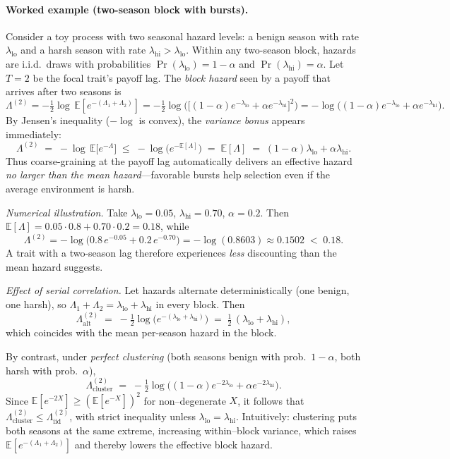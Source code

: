 \documentclass[11pt]{article}
\theoremstyle{upright}
\newcommand{\E}{\mathbb{E}}
\begin{document}
\paragraph{Worked example (two-season block with bursts).}
Consider a toy process with two seasonal hazard levels:
a benign season with rate $\lambda_{\mathrm{lo}}$ and a harsh season with rate $\lambda_{\mathrm{hi}}>\lambda_{\mathrm{lo}}$.
Within any two-season block, hazards are i.i.d.\ draws with probabilities
$\Pr(\lambda_{\mathrm{lo}})=1-\alpha$ and $\Pr(\lambda_{\mathrm{hi}})=\alpha$.
Let $T=2$ be the focal trait’s payoff lag. The \emph{block hazard} seen by a payoff that arrives after two seasons is
\[
\Lambda^{(2)}
= -\tfrac{1}{2}\log \,\E\!\left[e^{-(\Lambda_1+\Lambda_2)}\right]
= -\tfrac{1}{2}\log\!\Big( \big[(1-\alpha)e^{-\lambda_{\mathrm{lo}}}+\alpha e^{-\lambda_{\mathrm{hi}}}\big]^2 \Big)
= -\log\!\big((1-\alpha)e^{-\lambda_{\mathrm{lo}}}+\alpha e^{-\lambda_{\mathrm{hi}}}\big).
\]
By Jensen’s inequality ($-\log$ is convex), the \emph{variance bonus} appears immediately:
\[
\Lambda^{(2)} \;=\; -\log\,\E\!\big[e^{-\Lambda}\big]
\;\le\; -\log\!\big(e^{-\E[\Lambda]}\big) \;=\; \E[\Lambda]
\;=\; (1-\alpha)\lambda_{\mathrm{lo}}+\alpha\lambda_{\mathrm{hi}}.
\]
Thus coarse-graining at the payoff lag automatically delivers an effective hazard \emph{no larger than the mean hazard}—favorable bursts help selection even if the average environment is harsh.

\medskip
\noindent\textit{Numerical illustration.}
Take $\lambda_{\mathrm{lo}}=0.05$, $\lambda_{\mathrm{hi}}=0.70$, $\alpha=0.2$.
Then $\E[\Lambda]=0.05\cdot 0.8+0.70\cdot 0.2=0.18$,
while
\[
\Lambda^{(2)} = -\log\!\big(0.8\,e^{-0.05}+0.2\,e^{-0.70}\big)
= -\log(0.8603) \approx 0.1502 \;<\; 0.18.
\]
A trait with a two-season lag therefore experiences \emph{less} discounting than the mean hazard suggests.

\medskip
\noindent\textit{Effect of serial correlation.}
Let hazards alternate deterministically (one benign, one harsh), so $\Lambda_1+\Lambda_2=\lambda_{\mathrm{lo}}+\lambda_{\mathrm{hi}}$ in every block.
Then
\[
\Lambda^{(2)}_{\mathrm{alt}}
\;=\; -\tfrac{1}{2}\log\!\big(e^{-(\lambda_{\mathrm{lo}}+\lambda_{\mathrm{hi}})}\big)
\;=\; \tfrac{1}{2}\,(\lambda_{\mathrm{lo}}+\lambda_{\mathrm{hi}}),
\]
which coincides with the mean per-season hazard in the block.

By contrast, under \emph{perfect clustering} (both seasons benign with prob.\ $1-\alpha$,
both harsh with prob.\ $\alpha$),
\[
\Lambda^{(2)}_{\mathrm{cluster}}
\;=\; -\tfrac{1}{2}\log\!\Big((1-\alpha)e^{-2\lambda_{\mathrm{lo}}}+\alpha e^{-2\lambda_{\mathrm{hi}}}\Big).
\]
Since $\E[e^{-2X}]\ge (\E[e^{-X}])^2$ for non–degenerate $X$, it follows that
$\Lambda^{(2)}_{\mathrm{cluster}}\le \Lambda^{(2)}_{\mathrm{iid}}$,
with strict inequality unless $\lambda_{\mathrm{lo}}=\lambda_{\mathrm{hi}}$.
Intuitively: clustering puts both seasons at the same extreme, increasing within–block variance,
which raises $\E[e^{-(\Lambda_1+\Lambda_2)}]$ and thereby lowers the effective block hazard.
\end{document}
